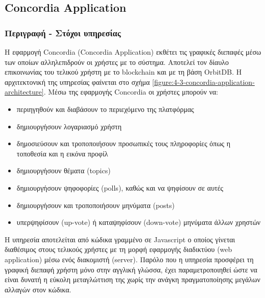 \subsection{Concordia Application} \label{subsection:4-3-2-concordia-application-service}

\subsubsection{Περιγραφή - Στόχοι υπηρεσίας}

Η εφαρμογή Concordia (Concordia Application) εκθέτει τις γραφικές διεπαφές μέσω των οποίων αλληλεπιδρούν οι χρήστες με το σύστημα. Αποτελεί τον δίαυλο επικοινωνίας του τελικού χρήστη με το blockchain και με τη βάση OrbitDB. Η αρχιτεκτονική της υπηρεσίας φαίνεται στο σχήμα \ref{figure:4-3-concordia-application-architecture}. Μέσω της εφαρμογής Concordia οι χρήστες μπορούν να:

\begin{itemize}
    \item περιηγηθούν και διαβάσουν το περιεχόμενο της πλατφόρμας

    \item δημιουργήσουν λογαριασμό χρήστη

    \item δημοσιεύσουν και τροποποιήσουν προσωπικές τους πληροφορίες όπως η τοποθεσία και η εικόνα προφίλ

    \item δημιουργήσουν θέματα (topics)

    \item δημιουργήσουν ψηφοφορίες (polls), καθώς και να ψηφίσουν σε αυτές

    \item δημιουργήσουν και τροποποιήσουν μηνύματα (posts)

    \item υπερψηφίσουν (up-vote) ή καταψηφίσουν (down-vote) μηνύματα άλλων χρηστών
\end{itemize}

Η υπηρεσία αποτελείται από κώδικα γραμμένο σε Javascript ο οποίος γίνεται διαθέσιμος στους τελικούς χρήστες με τη μορφή εφαρμογής διαδικτύου (web application) μέσω ενός διακομιστή (server). Παρόλο που η υπηρεσία προσφέρει τη γραφική διεπαφή χρήστη μόνο στην αγγλική γλώσσα, έχει παραμετροποιηθεί ώστε να είναι δυνατή η εύκολη μεταγλώττιση της χωρίς την ανάγκη πραγματοποίησης μεγάλων αλλαγών στον κώδικα.


